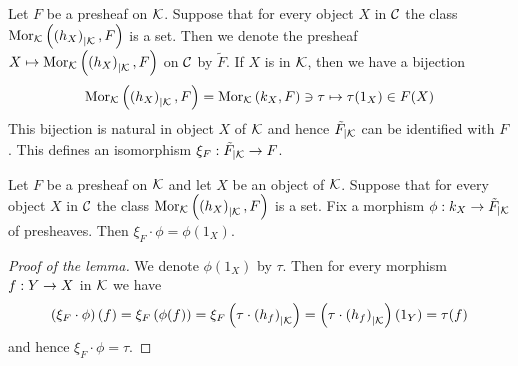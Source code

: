 \noindent
Let $F$ be a presheaf on ${\mathcal K}$. Suppose that for every object $X$ in ${\mathcal C}$ the class $\mathrm{Mor}_{{\mathcal K}}\left(\left(h_X\right)_{\mid {\mathcal K}},F\right)$ is a set. Then we denote the presheaf $X\mapsto \mathrm{Mor}_{{\mathcal K}}\left(\left(h_X\right)_{\mid {\mathcal K}},F\right)$ on ${\mathcal C}$ by $\tilde{F}$. If $X$ is in ${\mathcal K}$, then we have a bijection
$$\mathrm{Mor}_{{\mathcal K}}\left(\left(h_X\right)_{\mid {\mathcal K}},F\right) = \mathrm{Mor}_{{\mathcal K}}\left(k_X , F\right)\ni \tau \mapsto \tau(1_X)\in F(X)$$
This bijection is natural in object $X$ of ${\mathcal K}$ and hence $\tilde{F}_{\mid {\mathcal K}}$ can be identified with $F$. This defines an isomorphism $\xi_F:\tilde{F}_{\mid {\mathcal K}}\rightarrow F$.

\begin{lemma}\label{lemma:counitandsection}
Let $F$ be a presheaf on ${\mathcal K}$ and let $X$ be an object of ${\mathcal K}$. Suppose that for every object $X$ in ${\mathcal C}$ the class $\mathrm{Mor}_{{\mathcal K}}\left(\left(h_X\right)_{\mid {\mathcal K}},F\right)$ is a set. Fix a morphism $\phi:k_X\rightarrow \tilde{F}_{\mid {\mathcal K}}$ of presheaves. Then $\xi_F\cdot \phi = \phi(1_X)$.
\end{lemma}
\begin{proof}[Proof of the lemma]
We denote $\phi(1_X)$ by $\tau$. Then for every morphism $f:Y\rightarrow X$ in ${\mathcal K}$ we have
$$\left(\xi_{F}\cdot \phi\right)(f) = \xi_F\left(\phi(f)\right) = \xi_F\left(\tau\cdot \left(h_f\right)_{\mid {\mathcal K}}\right) = \left(\tau\cdot \left(h_f\right)_{\mid {\mathcal K}}\right)(1_Y) = \tau(f)$$
and hence $\xi_F\cdot \phi = \tau$.
\end{proof}

